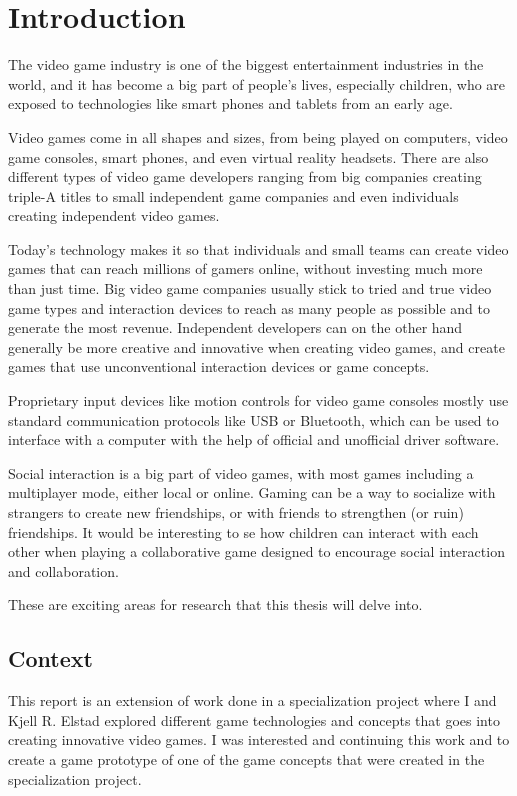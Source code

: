 \chapter{Introduction}
The video game industry is one of the biggest entertainment industries in the world, and it has become a big part of people's lives, especially children, who are exposed to technologies like smart phones and tablets from an early age. 

Video games come in all shapes and sizes, from being played on computers, video game consoles, smart phones, and even virtual reality headsets. There are also different types of video game developers ranging from big companies creating triple-A titles to small independent game companies and even individuals creating independent video games. 

Today's technology makes it so that individuals and small teams can create video games that can reach millions of gamers online, without investing much more than just time. Big video game companies usually stick to tried and true video game types and interaction devices to reach as many people as possible and to generate the most revenue. Independent developers can on the other hand generally be more creative and innovative when creating video games, and create games that use unconventional interaction devices or game concepts.

Proprietary input devices like motion controls for video game consoles mostly use standard communication protocols like USB or Bluetooth, which can be used to interface with a computer with the help of official and unofficial driver software. 

Social interaction is a big part of video games, with most games including a multiplayer mode, either local or online. Gaming can be a way to socialize with strangers to create new friendships, or with friends to strengthen (or ruin) friendships. It would be interesting to se how children can interact with each other when playing a collaborative game designed to encourage social interaction and collaboration.

These are exciting areas for research that this thesis will delve into.


\section{Context}
This report is an extension of work done in a specialization project where I and Kjell R. Elstad explored different game technologies and concepts that goes into creating innovative video games. I was interested and continuing this work and to create a game prototype of one of the game concepts that were created in the specialization project.


